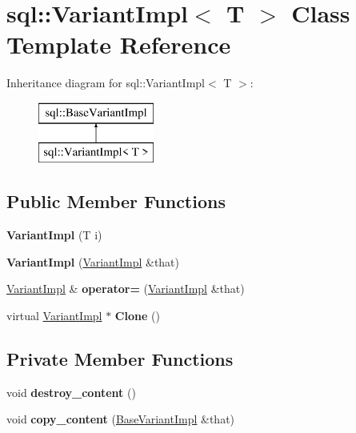 \hypertarget{classsql_1_1_variant_impl}{}\section{sql\+:\+:Variant\+Impl$<$ T $>$ Class Template Reference}
\label{classsql_1_1_variant_impl}
Inheritance diagram for sql\+:\+:Variant\+Impl$<$ T $>$\+:\begin{figure}[H]
\begin{center}
\leavevmode
\includegraphics[height=2.000000cm]{classsql_1_1_variant_impl}
\end{center}
\end{figure}
\subsection*{Public Member Functions}
\begin{DoxyCompactItemize}
\item 
\hypertarget{classsql_1_1_variant_impl_a1136a66ff16556a8de22c6f571d9cb36}{}\label{classsql_1_1_variant_impl_a1136a66ff16556a8de22c6f571d9cb36} 
{\bfseries Variant\+Impl} (T i)
\item 
\hypertarget{classsql_1_1_variant_impl_aef2f99e7bd996f7d2f4b2344306b9cfb}{}\label{classsql_1_1_variant_impl_aef2f99e7bd996f7d2f4b2344306b9cfb} 
{\bfseries Variant\+Impl} (\hyperlink{classsql_1_1_variant_impl}{Variant\+Impl} \&that)
\item 
\hypertarget{classsql_1_1_variant_impl_a9fea2f2251f67498a82c6a42caf58f81}{}\label{classsql_1_1_variant_impl_a9fea2f2251f67498a82c6a42caf58f81} 
\hyperlink{classsql_1_1_variant_impl}{Variant\+Impl} \& {\bfseries operator=} (\hyperlink{classsql_1_1_variant_impl}{Variant\+Impl} \&that)
\item 
\hypertarget{classsql_1_1_variant_impl_a529173b4d305ad80d9a8f65c2497ee52}{}\label{classsql_1_1_variant_impl_a529173b4d305ad80d9a8f65c2497ee52} 
virtual \hyperlink{classsql_1_1_variant_impl}{Variant\+Impl} $\ast$ {\bfseries Clone} ()
\end{DoxyCompactItemize}
\subsection*{Private Member Functions}
\begin{DoxyCompactItemize}
\item 
\hypertarget{classsql_1_1_variant_impl_a11e5e5148a11c3013b41f5d8d144e67b}{}\label{classsql_1_1_variant_impl_a11e5e5148a11c3013b41f5d8d144e67b} 
void {\bfseries destroy\+\_\+content} ()
\item 
\hypertarget{classsql_1_1_variant_impl_a38b50b688f3b7e045e218bce007042fb}{}\label{classsql_1_1_variant_impl_a38b50b688f3b7e045e218bce007042fb} 
void {\bfseries copy\+\_\+content} (\hyperlink{classsql_1_1_base_variant_impl}{Base\+Variant\+Impl} \&that)
\end{DoxyCompactItemize}
